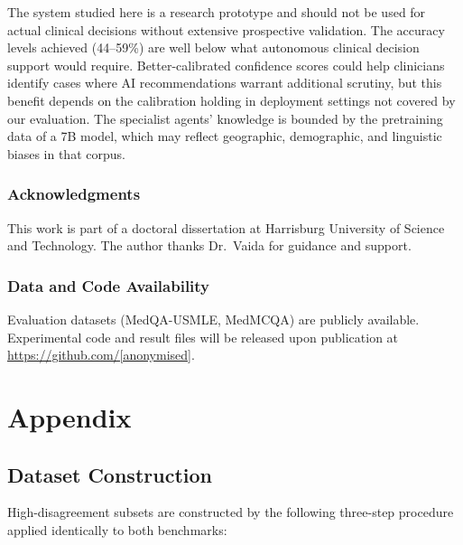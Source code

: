 \documentclass[10pt]{article}
\begin{document}
The system studied here is a research prototype and should not be used for
actual clinical decisions without extensive prospective validation.
The accuracy levels achieved (44--59\%) are well below what autonomous
clinical decision support would require.  Better-calibrated confidence scores
could help clinicians identify cases where AI recommendations warrant
additional scrutiny, but this benefit depends on the calibration holding
in deployment settings not covered by our evaluation.  The specialist agents'
knowledge is bounded by the pretraining data of a 7B model, which may
reflect geographic, demographic, and linguistic biases in that corpus.

\subsubsection*{Acknowledgments}

This work is part of a doctoral dissertation at Harrisburg University of
Science and Technology.  The author thanks Dr.~Vaida for guidance and support.

\subsubsection*{Data and Code Availability}

Evaluation datasets (MedQA-USMLE, MedMCQA) are publicly available.
Experimental code and result files will be released upon publication at
\url{https://github.com/[anonymised]}.




\appendix

\section{Appendix}

\subsection{Dataset Construction}
\label{app:data}

High-disagreement subsets are constructed by the following three-step
procedure applied identically to both benchmarks:
\end{document}
